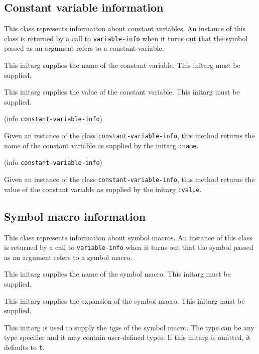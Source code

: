 \subsection{Constant variable information}


This class represents information about constant variables.   An
instance of this class is returned by a call to \texttt{variable-info}
when it turns out that the symbol passed as an argument refers to a
constant variable.


This initarg supplies the name of the constant variable.  This initarg
must be supplied. 


This initarg supplies the value of the constant variable.  This
initarg must be supplied.

 {(info {\tt constant-variable-info})}

Given an instance of the class \texttt{constant-variable-info}, this
method returns the name of the constant variable as supplied by the
initarg \texttt{:name}.

 {(info {\tt constant-variable-info})}

Given an instance of the class \texttt{constant-variable-info}, this
method returns the value of the constant variable as supplied by the
initarg \texttt{:value}.

\subsection{Symbol macro information}


This class represents information about symbol macros.  An
instance of this class is returned by a call to \texttt{variable-info}
when it turns out that the symbol passed as an argument refers to a
symbol macro.


This initarg supplies the name of the symbol macro.  This initarg must
be supplied.


This initarg supplies the expansion of the symbol macro.  This initarg
must be supplied.


This initarg is used to supply the \emph{type} of the symbol macro.
The type can be any type specifier and it may contain user-defined
types.  If this initarg is omitted, it defaults to \texttt{t}.


